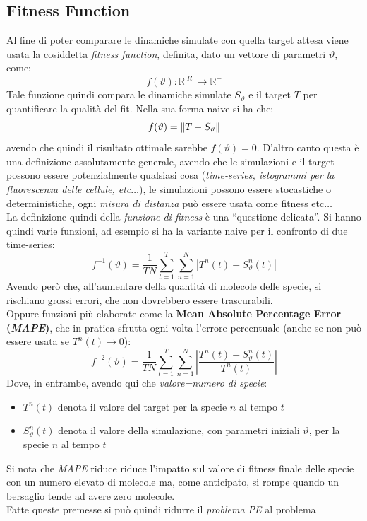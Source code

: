 \documentclass[a4paper,12pt, oneside]{book}
\begin{document}
\subsection{Fitness Function}
Al fine di poter comparare le dinamiche simulate con quella target attesa viene
usata la cosiddetta \textit{fitness function}, definita, dato un vettore di
parametri $\vartheta$, come:
\[f(\vartheta):\mathbb{R}^{|R|}\to\mathbb{R}^{+}\]
Tale funzione quindi compara le dinamiche simulate $S_\vartheta$ e il target $T$
per quantificare la qualità del fit. Nella sua forma naive si ha che:
\[f(\vartheta)=\norm{T-S_\vartheta}\]
avendo che quindi il risultato ottimale sarebbe $f(\vartheta) =0$. D'altro canto
questa è una definizione assolutamente generale, avendo che le simulazioni e il
target possono essere potenzialmente qualsiasi cosa (\textit{time-series,
  istogrammi per la fluorescenza delle cellule, etc$\ldots$}), le simulazioni
possono essere stocastiche o deterministiche, ogni \textit{misura di distanza}
può essere usata come fitness etc$\ldots$\\
La definizione quindi della \textit{funzione di fitness} è una ``questione
delicata''. Si hanno quindi varie funzioni, ad esempio si ha la variante naive
per il confronto di due time-series:
\[f^{-1}(\vartheta)=\frac{1}{TN}\sum_{t=1}^T\sum_{n=1}^N|T^n(t)-S_\vartheta^n(t)|\]
Avendo però che, all'aumentare della quantità di molecole delle specie, si
rischiano grossi errori, che non dovrebbero essere trascurabili.\\
Oppure funzioni più elaborate come la \textbf{Mean Absolute Percentage Error
  (\textit{MAPE})}, che in pratica sfrutta ogni volta l'errore percentuale
(anche se non può essere usata se $T^n(t)\to 0$):
\[f^{-2}(\vartheta)=\frac{1}{TN}\sum_{t=1}^T\sum_{n=1}^N\left|
    \frac{T^n(t)-S_\vartheta^n(t)}{T^n(t)}\right|\] 
Dove, in entrambe, avendo qui che \textit{valore=numero di specie}:
\begin{itemize}
  \item $T^n(t)$ denota il valore del target per la specie $n$ al tempo $t$
  \item $S_\vartheta^n(t)$ denota il valore della simulazione, con parametri
  iniziali $\vartheta$, per la specie $n$ al tempo $t$
\end{itemize}
Si nota che \textit{MAPE} riduce riduce l'impatto sul valore di fitness finale
delle specie con un numero elevato di molecole ma, come anticipato, si rompe
quando un bersaglio tende ad avere zero molecole.\\
Fatte queste premesse si può quindi ridurre il \textit{problema PE} al problema
\end{document}
